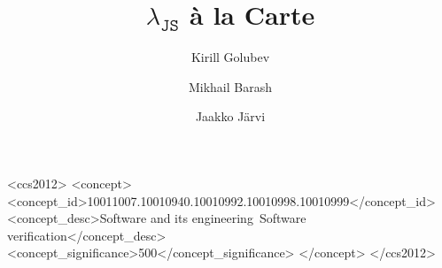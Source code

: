 \documentclass[sigplan,nonacm,review]{acmart}
\begin{document}
\title{$\lambda_{\texttt{JS}}$ à la Carte}

\author{Kirill Golubev}

\author{Mikhail Barash}

\author{Jaakko Järvi}






\renewcommand{\shortauthors}{Golubev}

\begin{CCSXML}
<ccs2012>
 <concept>
<concept_id>10011007.10010940.10010992.10010998.10010999</concept_id>
<concept_desc>Software and its engineering~Software verification</concept_desc>
<concept_significance>500</concept_significance>
</concept>
</ccs2012>
\end{CCSXML}

\end{document}
